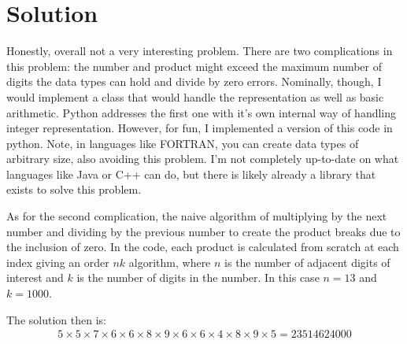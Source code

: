 \documentclass{article}
\begin{document}
\section*{Solution}
Honestly, overall not a very interesting problem. There are two complications in this problem: the number and product might exceed the maximum number of digits the data types can hold and divide by zero errors. Nominally, though, I would implement a class that would handle the representation as well as basic arithmetic. Python addresses the first one with it's own internal way of handling integer representation. However, for fun, I implemented a version of this code in python. Note, in languages like FORTRAN, you can create data types of arbitrary size, also avoiding this problem. I'm not completely up-to-date on what languages like Java or C++ can do, but there is likely already a library that exists to solve this problem.

As for the second complication, the naive algorithm of multiplying by the next number and dividing by the previous number to create the product breaks due to the inclusion of zero. In the code, each product is calculated from scratch at each index giving an order $nk$ algorithm, where $n$ is the number of adjacent digits of interest and $k$ is the number of digits in the number. In this case $n = 13$ and $k = 1000$. 

The solution then is:
\begin{gather}
	5 \times 5 \times 7 \times 6 \times 6 \times 8 \times 9 \times 6 \times 6 \times 4 \times 8 \times 9 \times 5 = 23514624000
\end{gather}
\end{document}
